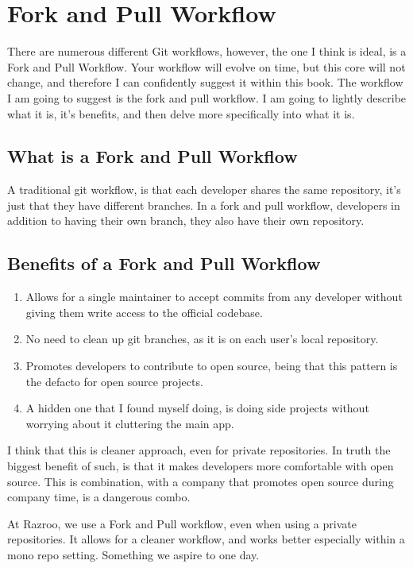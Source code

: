 \section { Fork and Pull Workflow }
There are numerous different Git workflows, however, the one I think is ideal, is a Fork and Pull Workflow. Your workflow will evolve on time, but this core will not change, and therefore I can confidently suggest it within this book. The workflow I am going to suggest is the fork and pull workflow. I am going to lightly describe what it is, it's benefits, and then delve more specifically into what it is.

\subsection{What is a Fork and Pull Workflow}
A traditional git workflow, is that each developer shares the same repository, it's just that they have different branches. In a fork and pull workflow, developers in addition to having their own branch, they also have their own repository.

\subsection{Benefits of a Fork and Pull Workflow}
\begin{enumerate}
  \item Allows for a single maintainer to accept commits from any developer without giving them write access to the official codebase. 
  \item No need to clean up git branches, as it is on each user's local repository.
  \item Promotes developers to contribute to open source, being that this pattern is the defacto for open source projects. 
  \item A hidden one that I found myself doing, is doing side projects without worrying about it cluttering the main app.
\end{enumerate}

I think that this is cleaner approach, even for private repositories. In truth the biggest benefit of such, is that it makes developers more comfortable with open source. This is combination, with a company that promotes open source during company time, is a dangerous combo.

At Razroo, we use a Fork and Pull workflow, even when using a private repositories. It allows for a cleaner workflow, and works better especially within a mono repo setting. Something we aspire to one day. 


